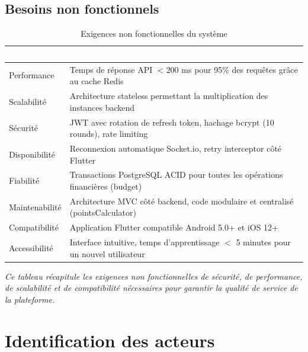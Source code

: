 \subsection{Besoins non fonctionnels}

\vspace{0.3cm}

\begin{table}[!htbp]
\centering
    \begin{tabularx}{\linewidth}{|l|X|}
        \hline
        \rowcolor{emsigreen}\textcolor{white}{\textbf{Catégorie}} & \textcolor{white}{\textbf{Exigence}} \\
        \hline
        Performance & Temps de réponse API $< 200$ ms pour 95\% des requêtes grâce au cache Redis \\
        \hline
        Scalabilité & Architecture stateless permettant la multiplication des instances backend \\
        \hline
        Sécurité & JWT avec rotation de refresh token, hachage bcrypt (10 rounds), rate limiting \\
        \hline
        Disponibilité & Reconnexion automatique Socket.io, retry interceptor côté Flutter \\
        \hline
        Fiabilité & Transactions PostgreSQL ACID pour toutes les opérations financières (budget) \\
        \hline
        Maintenabilité & Architecture MVC côté backend, code modulaire et centralisé (pointsCalculator) \\
        \hline
        Compatibilité & Application Flutter compatible Android 5.0+ et iOS 12+ \\
        \hline
        Accessibilité & Interface intuitive, temps d'apprentissage $<$ 5 minutes pour un nouvel utilisateur \\
        \hline
    \end{tabularx}
\caption{Exigences non fonctionnelles du système}
\end{table}

\vspace{0.2cm}
\noindent\small\textit{Ce tableau récapitule les exigences non fonctionnelles de sécurité, de performance, de scalabilité et de compatibilité nécessaires pour garantir la qualité de service de la plateforme.}\normalsize

\section{Identification des acteurs}

